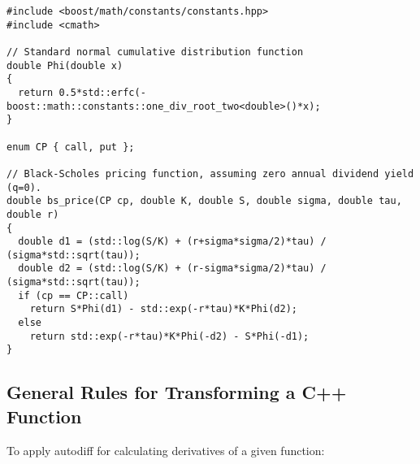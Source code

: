 \documentclass{article}
\begin{document}
\begingroup
\fontsize{10pt}{10pt}\selectfont
\begin{verbatim}
#include <boost/math/constants/constants.hpp>
#include <cmath>

// Standard normal cumulative distribution function
double Phi(double x)
{
  return 0.5*std::erfc(-boost::math::constants::one_div_root_two<double>()*x);
}

enum CP { call, put };

// Black-Scholes pricing function, assuming zero annual dividend yield (q=0).
double bs_price(CP cp, double K, double S, double sigma, double tau, double r)
{
  double d1 = (std::log(S/K) + (r+sigma*sigma/2)*tau) / (sigma*std::sqrt(tau));
  double d2 = (std::log(S/K) + (r-sigma*sigma/2)*tau) / (sigma*std::sqrt(tau));
  if (cp == CP::call)
    return S*Phi(d1) - std::exp(-r*tau)*K*Phi(d2);
  else
    return std::exp(-r*tau)*K*Phi(-d2) - S*Phi(-d1);
}
\end{verbatim}
\endgroup

\subsection{General Rules for Transforming a C++ Function}
To apply autodiff for calculating derivatives of a given function:
\end{document}
